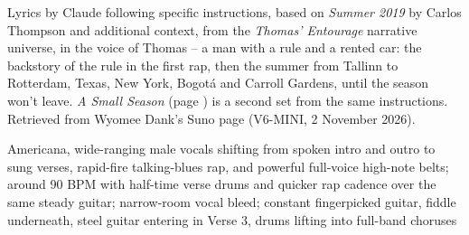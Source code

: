 
\label{sec:small-season}
\begin{notes}
Lyrics by Claude following specific instructions, based on \emph{Summer 2019} by Carlos Thompson and additional context, from the \emph{Thomas' Entourage} narrative universe, in the voice of Thomas -- a man with a rule and a rented car: the backstory of the rule in the first rap, then the summer from Tallinn to Rotterdam, Texas, New York, Bogotá and Carroll Gardens, until the season won't leave. \emph{A Small Season} (page \pageref{sec:a-small-season}) is a second set from the same instructions. Retrieved from Wyomee Dank's Suno page (V6-MINI, 2 November 2026).
\end{notes}
\begin{style}
Americana, wide-ranging male vocals shifting from spoken intro and outro to sung verses, rapid-fire talking-blues rap, and powerful full-voice high-note belts; around 90 BPM with half-time verse drums and quicker rap cadence over the same steady guitar; narrow-room vocal bleed; constant fingerpicked guitar, fiddle underneath, steel guitar entering in Verse 3, drums lifting into full-band choruses
\end{style}
